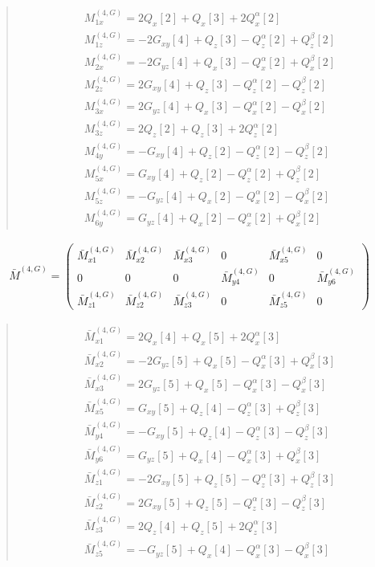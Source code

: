 \documentclass[fleqn,10pt]{jsarticle}
\begin{document}
\begin{quote}
\begin{align*}
& M^{(4,G)}_{1x} = 2 Q_{x}[2] + Q_{x}[3] + 2 Q_{x}^{\alpha}[2] \\
& M^{(4,G)}_{1z} = - 2 G_{xy}[4] + Q_{z}[3] - Q_{z}^{\alpha}[2] + Q_{z}^{\beta}[2] \\
& M^{(4,G)}_{2x} = - 2 G_{yz}[4] + Q_{x}[3] - Q_{x}^{\alpha}[2] + Q_{x}^{\beta}[2] \\
& M^{(4,G)}_{2z} = 2 G_{xy}[4] + Q_{z}[3] - Q_{z}^{\alpha}[2] - Q_{z}^{\beta}[2] \\
& M^{(4,G)}_{3x} = 2 G_{yz}[4] + Q_{x}[3] - Q_{x}^{\alpha}[2] - Q_{x}^{\beta}[2] \\
& M^{(4,G)}_{3z} = 2 Q_{z}[2] + Q_{z}[3] + 2 Q_{z}^{\alpha}[2] \\
& M^{(4,G)}_{4y} = - G_{xy}[4] + Q_{z}[2] - Q_{z}^{\alpha}[2] - Q_{z}^{\beta}[2] \\
& M^{(4,G)}_{5x} = G_{xy}[4] + Q_{z}[2] - Q_{z}^{\alpha}[2] + Q_{z}^{\beta}[2] \\
& M^{(4,G)}_{5z} = - G_{yz}[4] + Q_{x}[2] - Q_{x}^{\alpha}[2] - Q_{x}^{\beta}[2] \\
& M^{(4,G)}_{6y} = G_{yz}[4] + Q_{x}[2] - Q_{x}^{\alpha}[2] + Q_{x}^{\beta}[2]
\end{align*}
\end{quote}
\begin{align*}
\bar{M}^{(4,G)} = \begin{pmatrix} \bar{M}^{(4,G)}_{x1} & \bar{M}^{(4,G)}_{x2} & \bar{M}^{(4,G)}_{x3} & 0 & \bar{M}^{(4,G)}_{x5} & 0 \\ 0 & 0 & 0 & \bar{M}^{(4,G)}_{y4} & 0 & \bar{M}^{(4,G)}_{y6} \\ \bar{M}^{(4,G)}_{z1} & \bar{M}^{(4,G)}_{z2} & \bar{M}^{(4,G)}_{z3} & 0 & \bar{M}^{(4,G)}_{z5} & 0 \end{pmatrix}
\end{align*}
\begin{quote}
\begin{align*}
& \bar{M}^{(4,G)}_{x1} = 2 Q_{x}[4] + Q_{x}[5] + 2 Q_{x}^{\alpha}[3] \\
& \bar{M}^{(4,G)}_{x2} = - 2 G_{yz}[5] + Q_{x}[5] - Q_{x}^{\alpha}[3] + Q_{x}^{\beta}[3] \\
& \bar{M}^{(4,G)}_{x3} = 2 G_{yz}[5] + Q_{x}[5] - Q_{x}^{\alpha}[3] - Q_{x}^{\beta}[3] \\
& \bar{M}^{(4,G)}_{x5} = G_{xy}[5] + Q_{z}[4] - Q_{z}^{\alpha}[3] + Q_{z}^{\beta}[3] \\
& \bar{M}^{(4,G)}_{y4} = - G_{xy}[5] + Q_{z}[4] - Q_{z}^{\alpha}[3] - Q_{z}^{\beta}[3] \\
& \bar{M}^{(4,G)}_{y6} = G_{yz}[5] + Q_{x}[4] - Q_{x}^{\alpha}[3] + Q_{x}^{\beta}[3] \\
& \bar{M}^{(4,G)}_{z1} = - 2 G_{xy}[5] + Q_{z}[5] - Q_{z}^{\alpha}[3] + Q_{z}^{\beta}[3] \\
& \bar{M}^{(4,G)}_{z2} = 2 G_{xy}[5] + Q_{z}[5] - Q_{z}^{\alpha}[3] - Q_{z}^{\beta}[3] \\
& \bar{M}^{(4,G)}_{z3} = 2 Q_{z}[4] + Q_{z}[5] + 2 Q_{z}^{\alpha}[3] \\
& \bar{M}^{(4,G)}_{z5} = - G_{yz}[5] + Q_{x}[4] - Q_{x}^{\alpha}[3] - Q_{x}^{\beta}[3]
\end{align*}
\end{quote}
\end{document}
